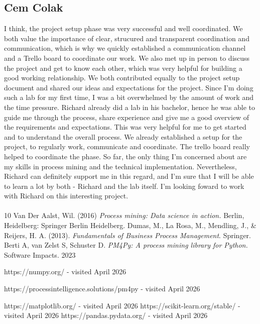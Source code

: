 \documentclass[12pt,a4paper]{article}
\begin{document}
\subsection{Cem Colak}
I think, the project setup phase was very successful and well coordinated. We both value the importance of clear, strucured and transparent coordination and communication, which is why we quickly established a communication channel and a Trello board to coordinate our work. We also met up in person to discuss the project and get to know each other, which was very helpful for building a good working relationship. We both contributed equally to the project setup document and shared our ideas and expectations for the project.
Since I'm doing such a lab for my first time, I was a bit overwhelmed by the amount of work and the time pressure. Richard already did a lab in his bachelor, hence he was able to guide me through the process, share experience and give me a good overview of the requirements and expectations. This was very helpful for me to get started and to understand the overall process.
We already established a setup for the project, to regularly work, communicate and coordinate. The trello board really helped to coordinate the phase.
So far, the only thing I'm concerned about are my skills in process mining and the technical implementation. Nevertheless, Richard can definitely support me in this regard, and I'm sure that I will be able to learn a lot by both - Richard and the lab itself. I'm looking foward to work with Richard on this interesting project.

\paragraph{}
\begin{thebibliography}{10}
Van Der Aalst, Wil. (2016) \textit{Process mining: Data science in action.} Berlin, Heidelberg: Springer Berlin Heidelberg.
Dumas, M., La Rosa, M., Mendling, J., \& Reijers, H. A. (2013). \textit{Fundamentals of Business Process Management}. Springer.
Berti A, van Zelst S, Schuster D. \textit{PM4Py: A process mining library for Python.} Software Impacts. 2023

https://numpy.org/ - visited April 2026

https://processintelligence.solutions/pm4py - visited April 2026

https://matplotlib.org/ - visited April 2026
https://scikit-learn.org/stable/ - visited April 2026
https://pandas.pydata.org/ - visited April 2026
\end{thebibliography}
\end{document}
